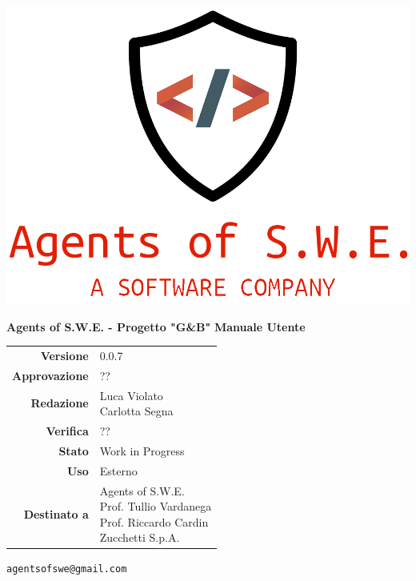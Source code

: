 


\begin{titlepage}
\thispagestyle{empty}

\begin{center}

\includegraphics[scale=0.3]{./images/logo.png} 

\large \textbf{Agents of S.W.E. - Progetto "G\&B"}
\vfill
\Huge \textbf{Manuale Utente}
\vfill
\large
\renewcommand{\arraystretch}{1.3}
\begin{tabular}{r|l}
\textbf{Versione} & 0.0.7\\
\textbf{Approvazione} & ??\\
\textbf{Redazione} & \parbox[t]{5cm}{Luca Violato\\Carlotta Segna}\\
\textbf{Verifica} & \parbox[t]{5cm}{??}\\
\textbf{Stato} & Work in Progress\\
\textbf{Uso} & Esterno\\
\textbf{Destinato a} & \parbox[t]{5cm}{Agents of S.W.E. \\Prof. Tullio Vardanega\\Prof. Riccardo Cardin \\ Zucchetti S.p.A.}
\end{tabular}
\vfill
\small
\texttt{agentsofswe@gmail.com}
\end{center}
\end{titlepage}

\pagebreak


